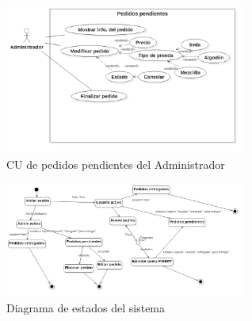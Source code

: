 \begin{figure}[h]
\begin{center}
\includegraphics[width=8cm]{./imagenes/diagramas/CU_PedidosPendientes(Admin).png}
\end{center}
\caption{CU de pedidos pendientes del Administrador}
\end{figure}


\begin{figure}[h]
\begin{center}
\includegraphics[width=8cm]{./imagenes/diagramas/Estado_lavanderia.png}
\end{center}
\caption{Diagrama de estados del sistema}
\end{figure}


